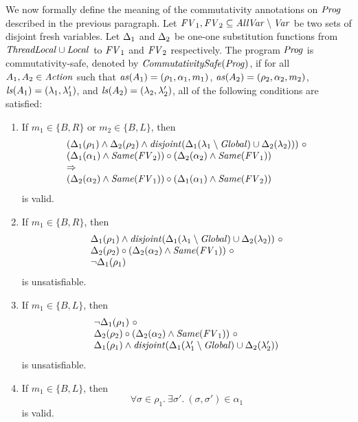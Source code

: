 We now formally define the meaning of the commutativity annotations on $\mathit{Prog}$ described in the previous paragraph.
Let $\mathit{FV}_1,\mathit{FV}_2 \subseteq \mathit{AllVar} \setminus \mathit{Var}$ be two sets of disjoint fresh variables.
Let $\Delta_1$ and $\Delta_2$ be one-one 
substitution functions from $\mathit{ThreadLocal} \cup \mathit{Local}$ to $\mathit{FV}_1$ and $\mathit{FV}_2$ respectively.
The program $\mathit{Prog}$ is commutativity-safe, denoted by $\mathit{CommutativitySafe}(\mathit{Prog})$,
if for all $A_1,A_2 \in \mathit{Action}$ such that $\mathit{as}(A_1) = (\rho_1,\alpha_1,m_1)$, $\mathit{as}(A_2) = (\rho_2,\alpha_2,m_2)$,
$\mathit{ls}(A_1) = (\lambda_1,\lambda'_1)$, and $\mathit{ls}(A_2) = (\lambda_2,\lambda'_2)$, 
all of the following conditions are satisfied:
\begin{enumerate}
\item
If $m_1 \in \{B,R\}$ or $m_2 \in \{B,L\}$, then 
\[
\begin{array}{l}
(\Subst_1(\rho_1) \wedge \Subst_2(\rho_2) \wedge \disjoint(\Subst_1(\lins_1 \setminus \Global) \cup \Subst_2(\lins_2)))\ \circ \\
(\Subst_1(\alpha_1) \wedge \Same(\FV_2)) \circ (\Subst_2(\alpha_2) \wedge \Same(\FV_1)) \\ 
\Rightarrow \\
(\Subst_2(\alpha_2) \wedge \Same(\FV_1)) \circ (\Subst_1(\alpha_1) \wedge \Same(\FV_2))
\end{array}
\]
is valid.
\item
If $m_1 \in \{B,R\}$, then 
\[
\begin{array}{l}
\Delta_1(\rho_1) \wedge \mathit{disjoint}(\Delta_1(\lambda_1 \setminus \mathit{Global}) \cup \Delta_2(\lambda_2))\ \circ \\
\Delta_2(\rho_2) \circ (\Delta_2(\alpha_2) \wedge \mathit{Same}(\mathit{FV}_1))\ \circ \\
\neg \Delta_1(\rho_1)
\end{array}
\]
is unsatisfiable.
\item
If $m_1 \in \{B,L\}$, then 
\[
\begin{array}{l}
\neg \Delta_1(\rho_1)\ \circ \\
\Delta_2(\rho_2) \circ (\Delta_2(\alpha_2) \wedge \mathit{Same}(\mathit{FV}_1))\ \circ \\
\Delta_1(\rho_1) \wedge \mathit{disjoint}(\Delta_1(\lambda'_1 \setminus \mathit{Global}) \cup \Delta_2(\lambda'_2))
\end{array}
\]
is unsatisfiable.
\item
If $m_1 \in \{B, L\}$, then
\[
\forall \sigma \in \rho_1.\ \exists \sigma'.\ (\sigma, \sigma') \in \alpha_1
\]
is valid.
\end{enumerate}

